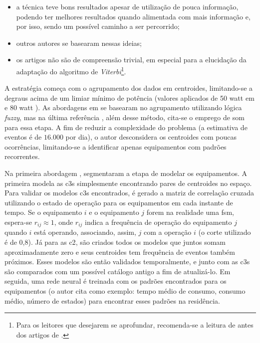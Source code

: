 \begin{enumerate}[label=\textbf{1.\arabic*},wide=\parindent]
\begin{enumerate}[label*=.\textbf{\arabic*},wide=\parindent]
\begin{itemize}[wide=\parindent]
\begin{itemize}
\item a técnica teve bons resultados apesar de utilização de pouca
informação, podendo ter melhores resultados quando alimentada com mais
informação e, por isso, sendo um possível caminho a ser percorrido;
\item outros autores \cite{nilm_bergman_distribuido_2011,
nilm_zeifman_vast_2011,nilm_zeifman_vast_hisample_pdfmerge_2011,
nilm_zeifman_vastext_approach_2012,
nilm_zeifman_statistical_vastext_1stws_2012,
nilm_zeifman_statistical_naive_enduses_2013} se basearam nessas
ideias;
\item os artigos não são de compreensão trivial, em especial para a
elucidação da adaptação do algoritmo de \emph{Viterbi}\footnote{Para os
leitores que desejarem se aprofundar, recomenda-se a leitura de
\cite{nilm_bergman_distribuido_2011} antes dos artigos de
\citeauthor*{nilm_baranski_genetic_detalhado_2004_20}.}. 
\end{itemize}


A estratégia começa com o agrupamento dos dados em centroides,
limitando-se a degraus acima de um limiar mínimo de potência (valores
aplicados de 50 \acs{watt} em
\cite{nilm_baranski_genetic_base_2003_19} e 80 \acs{watt}
\cite{nilm_baranski_genetic_detalhado_2004_20}). As abordagens em
\cite{nilm_baranski_genetic_base_2003_19,
nilm_baranski_genetic_detalhado_2004_20} se basearam no agrupamento
utilizando lógica \emph{fuzzy}, mas na última referência
\cite{nilm_baranski_summary_2004_21}, além desse método, cita-se o
emprego de \gls{som} para essa etapa. A fim de reduzir a complexidade
do problema (a estimativa de eventos é de $16.000$ por dia), o autor
desconsidera os centroides com poucas ocorrências, limitando-se a
identificar apenas equipamentos com padrões recorrentes. 

Na primeira abordagem \cite{nilm_baranski_genetic_base_2003_19},
\citeauthor*{nilm_baranski_genetic_base_2003_19} segmentaram a etapa
de modelar os equipamentos. A primeira modela as \glspl{c3} simplesmente
encontrando pares de centroides no espaço. Para validar os modelos
\glspl{c3} encontrados, é gerado a matriz de correlação cruzada
utilizando o estado de operação para os equipamentos em cada instante de
tempo. Se o equipamento $i$ e o equipamento $j$ forem na realidade uma
\gls{fsm}, espera-se $r_{ij}\approx1$, onde $r_{ij}$ indica a
frequência de operação do equipamento $j$ quando $i$ está operando,
associando, assim, $j$ com a operação $i$ (o corte utilizado é de
0,8). Já para as \gls{c2}, são criados todos os modelos que
juntos somam aproximadamente zero e seus centroides tem frequência de
eventos também próximos. Esses modelos são então validados
temporalmente, e junto com as \glspl{c3} são comparados com um
possível catálogo antigo a fim de atualizá-lo. Em seguida, uma rede
neural é treinada com os padrões encontrados para os equipamentos (o
autor cita como exemplo: tempo médio de consumo, consumo médio, número
de estados) para encontrar esses padrões na residência.


\end{itemize}
\end{enumerate}
\end{enumerate}
